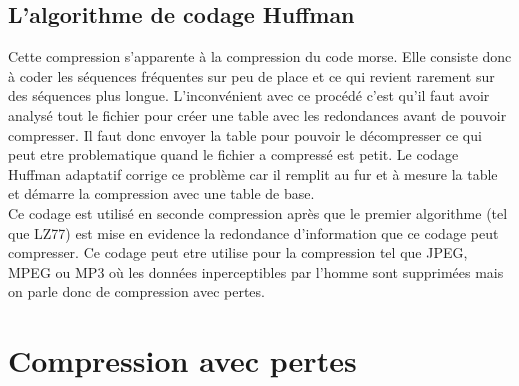 \documentclass[a4paper]{report}
\begin{document}
	\subsection{L'algorithme de codage Huffman}
		Cette compression s'apparente à la compression du code morse. Elle consiste donc à coder les séquences fréquentes sur peu de place et ce qui revient rarement sur des séquences plus longue. L'inconvénient avec ce procédé c'est qu'il faut avoir analysé tout le fichier pour créer une table avec les redondances avant de pouvoir compresser. Il faut donc envoyer la table pour pouvoir le décompresser ce qui peut etre problematique quand le fichier a compressé est petit. Le codage Huffman adaptatif corrige ce problème car il remplit au fur et à mesure la table et démarre la compression avec une table de base. \\
	Ce codage est utilisé en seconde compression après que le premier algorithme (tel que LZ77) est mise en evidence la redondance d'information que ce codage peut compresser. Ce codage peut etre utilise pour la compression tel que JPEG, MPEG ou MP3 où les données inperceptibles par l'homme sont supprimées mais on parle donc de compression avec pertes.
	\section{Compression avec pertes}

         
\end{document}
